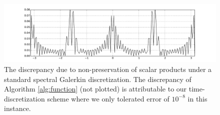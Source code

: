 \documentclass[final,leqno]{siamart}
\begin{document}
\begin{figure}[h!]
	\hspace*{-1.2cm}
	\includegraphics[width=1.15\textwidth]{./images/function_plots/discrepancy}
	\caption{The discrepancy due to non-preservation of scalar products under a standard spectral Galerkin discretization. 
	The discrepancy of Algorithm \ref{alg:function} (not plotted) is attributable to our time-discretization scheme where we only tolerated error of $10^{-8}$ in this instance.}
	\label{fig:discrepancy}
\end{figure}  
\end{document}
